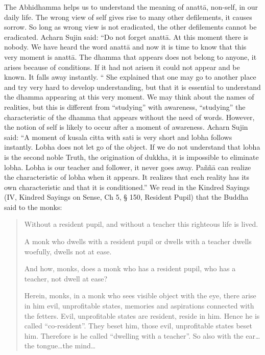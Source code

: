 The Abhidhamma helps us to understand the meaning of anattā, non-self, in our daily life. The wrong view of self gives rise to many other defilements, it causes sorrow. So long as wrong view is not eradicated, the other defilements cannot be eradicated.
Acharn Sujin said: ``Do not forget anattā. At this moment there is nobody. We have heard the word anattā and now it is time to know that this very moment is anattā. The dhamma that appears does not belong to anyone, it arises because of conditions. If it had not arisen it could not appear and be known. It falls away instantly. `` She explained that one may go to another place and try very hard to develop understanding, but that it is essential to understand the dhamma appearing at this very moment. We may think about the names of realities, but this is different from ``studying'' with awareness, ``studying'' the characteristic of the dhamma that appears without the need of words. However, the notion of self is likely to occur after a moment of awareness. Acharn Sujin said: ``A moment of kusala citta with sati is very short and lobha follows instantly. Lobha does not let go of the object. If we do not understand that lobha is the second noble Truth, the origination of dukkha, it is impossible to eliminate lobha. Lobha is our teacher and follower, it never goes away. Paññā can realize the characteristic of lobha when it appears. It realizes that each reality has its own characteristic and that it is conditioned.''
We read in the Kindred Sayings (IV, Kindred Sayings on Sense, Ch 5, § 150, Resident Pupil) that the Buddha said to the monks:

\begin{quote}
Without a resident pupil, and without a teacher this righteous life is lived.

A monk who dwells with a resident pupil or dwells with a teacher dwells woefully, dwells not at ease.

And how, monks, does a monk who has a resident pupil, who has a teacher, not dwell at ease?

Herein, monks, in a monk who sees visible object with the eye, there arise in him evil, unprofitable states, memories and aspirations connected with the fetters.
Evil, unprofitable states are resident, reside in him. Hence he is called ``co-resident''. They beset him, those evil, unprofitable states beset him. Therefore is he called ``dwelling with a teacher''.
So also with the ear\ldots the tongue\ldots the mind\ldots
\end{quote}

